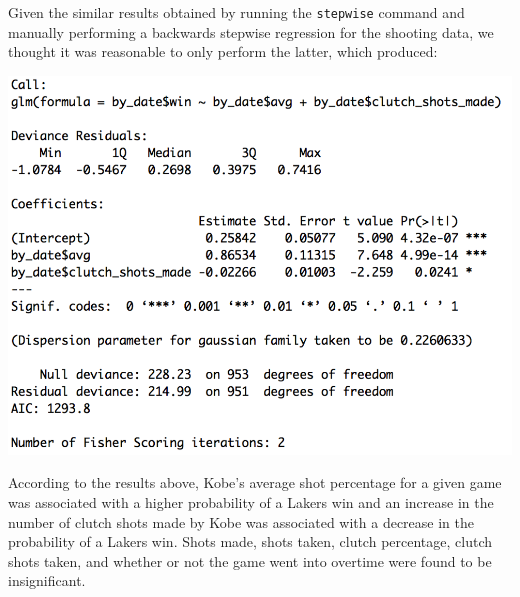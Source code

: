 \documentclass[paper=a4, fontsize=11pt]{scrartcl} %
\numberwithin{equation}{section} %
\numberwithin{figure}{section} %
\numberwithin{table}{section} %
\begin{document}
\hspace*{1cm}Given the similar results obtained by running the \texttt{stepwise} command and manually performing a backwards stepwise regression for the shooting data, we thought it was reasonable to only perform the latter, which produced:
\begin{center}
	\includegraphics[scale=0.65]{img/logitwins}
\end{center}
\hspace*{1cm}According to the results above, Kobe's average shot percentage for a given game was associated with a higher probability of a Lakers win and an increase in the number of clutch shots made by Kobe was associated with a decrease in the probability of a Lakers win. Shots made, shots taken, clutch percentage, clutch shots taken, and whether or not the game went into overtime were found to be insignificant. 
\end{document}
